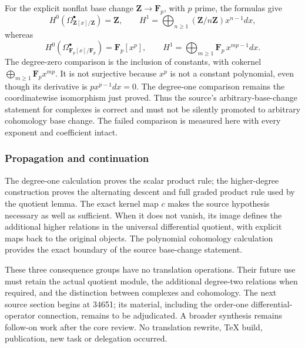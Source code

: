 For the explicit nonflat base change \(\mathbf Z\to\mathbf F_p\), with \(p\) prime, the formulas give \[
H^0(\Omega_{\mathbf Z[x]/\mathbf Z}^\bullet)=\mathbf Z,
\qquad H^1=\bigoplus_{n\ge1}(\mathbf Z/n\mathbf Z)x^{n-1}dx,
\] whereas \[
H^0(\Omega_{\mathbf F_p[x]/\mathbf F_p}^\bullet)=\mathbf F_p[x^p],
\qquad H^1=\bigoplus_{m\ge1}\mathbf F_p\,x^{mp-1}dx.
\] The degree-zero comparison is the inclusion of constants, with cokernel \(\bigoplus_{m\ge1}\mathbf F_p x^{mp}\). It is not surjective because \(x^p\) is not a constant polynomial, even though its derivative is \(p x^{p-1}dx=0\). The degree-one comparison remains the coordinatewise isomorphism just proved. Thus the source's arbitrary-base-change statement for complexes is correct and must not be silently promoted to arbitrary cohomology base change. The failed comparison is measured here with every exponent and coefficient intact.

\subsubsection{Propagation and continuation}\label{algebra-proof-042-propagation-and-continuation}

The degree-one calculation proves the scalar product rule; the higher-degree construction proves the alternating descent and full graded product rule used by the quotient lemma. The exact kernel map \(c\) makes the source hypothesis necessary as well as sufficient. When it does not vanish, its image defines the additional higher relations in the universal differential quotient, with explicit maps back to the original objects. The polynomial cohomology calculation provides the exact boundary of the source base-change statement.

These three consequence groups have no translation operations. Their future use must retain the actual quotient module, the additional degree-two relations when required, and the distinction between complexes and cohomology. The next source section begins at 34651; its material, including the order-one differential-operator connection, remains to be adjudicated. A broader synthesis remains follow-on work after the core review. No translation rewrite, TeX build, publication, new task or delegation occurred.
